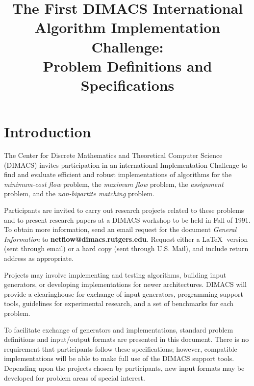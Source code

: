 \setlength{\topmargin}{-.5in}
\addtolength{\textheight}{1.5in}
\addtolength{\textwidth}{\evensidemargin}
\addtolength{\textwidth}{\oddsidemargin}
\setlength{\oddsidemargin}{.25in}
\setlength{\evensidemargin}{.25in}
\addtolength{\textwidth}{-1.0\oddsidemargin}
\addtolength{\textwidth}{-1.0\evensidemargin}

\setlength{\baselineskip}{18pt}
\sloppy 

\title{ The First DIMACS International \\ 
Algorithm Implementation Challenge: \\
Problem Definitions and Specifications
}
\author{}

\maketitle 

\section{Introduction}

The Center for Discrete Mathematics and Theoretical Computer Science
(DIMACS) invites participation in an international Implementation 
Challenge to find and evaluate 
efficient and robust implementations of algorithms for 
the {\em minimum-cost flow} problem,
the {\em maximum flow} problem, the {\em assignment} problem, 
and the {\em non-bipartite matching} problem.  

Participants are invited to carry out research projects related to 
these problems and to present research papers at a DIMACS workshop to be 
held in Fall of 1991.  To obtain  more information, send  
an email request for the document {\em General Information} to  
{\bf netflow@dimacs.rutgers.edu}.  
Request either a \LaTeX$\;$ version (sent through email) or 
a hard copy (sent through U.S. Mail), and include return address as
appropriate.  

Projects may involve implementing and testing algorithms, 
building input generators, or developing implementations 
for newer architectures.  DIMACS will provide a clearinghouse for 
exchange of input generators, programming support tools,  
guidelines for experimental research, and a set of benchmarks for
each problem.   

To facilitate exchange of generators and implementations, 
standard problem definitions and input/output formats are 
presented in this document.  There is no 
requirement that participants follow these 
specifications; however,  compatible implementations 
will be able to make full use of the DIMACS support tools. 
Depending upon the projects chosen by participants, 
new input formats may be developed for problem areas of special 
interest.  

